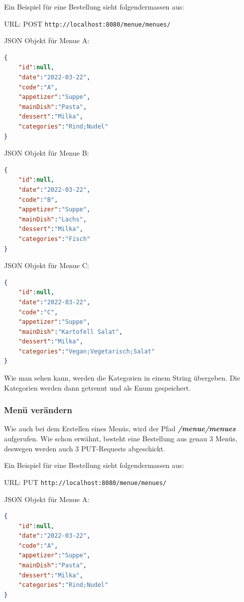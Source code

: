 Ein Beispiel für eine Bestellung sieht folgendermassen aus:

URL: POST \colorbox{white}{\lstinline[basicstyle=\ttfamily\color{black},language=html]|http://localhost:8080/menue/menues/|}


JSON Objekt für Menue A:

\begin{lstlisting}[language=json,firstnumber=1]
{
    "id":null,
    "date":"2022-03-22",
    "code":"A",
    "appetizer":"Suppe",
    "mainDish":"Pasta",
    "dessert":"Milka",
    "categories":"Rind;Nudel"
}
\end{lstlisting}

JSON Objekt für Menue B:

\begin{lstlisting}[language=json,firstnumber=1]
{
    "id":null,
    "date":"2022-03-22",
    "code":"B",
    "appetizer":"Suppe",
    "mainDish":"Lachs",
    "dessert":"Milka",
    "categories":"Fisch"
}
\end{lstlisting}

JSON Objekt für Menue C:

\begin{lstlisting}[language=json,firstnumber=1]
{
    "id":null,
    "date":"2022-03-22",
    "code":"C",
    "appetizer":"Suppe",
    "mainDish":"Kartofell Salat",
    "dessert":"Milka",
    "categories":"Vegan;Vegetarisch;Salat"
}
\end{lstlisting}

Wie man sehen kann, werden die Kategorien in einem String übergeben. Die Kategorien werden dann getrennt und als Enum gespeichert.

\subsubsection{Menü verändern}

Wie auch bei dem Erstellen eines Menüs, wird der Pfad \textbf{\textit{/menue/menues}} aufgerufen. 
Wie schon erwähnt, besteht eine Bestellung aus genau 3 Menüs, deswegen werden auch 3 PUT-Requests abgeschickt.

Ein Beispiel für eine Bestellung sieht folgendermassen aus:

URL: PUT \colorbox{white}{\lstinline[basicstyle=\ttfamily\color{black},language=html]|http://localhost:8080/menue/menues/|}

JSON Objekt für Menue A:

\begin{lstlisting}[language=json,firstnumber=1]
{
    "id":null,
    "date":"2022-03-22",
    "code":"A",
    "appetizer":"Suppe",
    "mainDish":"Pasta",
    "dessert":"Milka",
    "categories":"Rind;Nudel"
}
\end{lstlisting}


